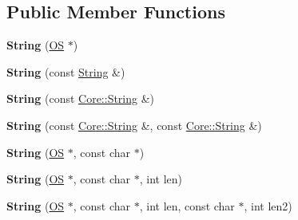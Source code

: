 \subsection*{Public Member Functions}
\begin{DoxyCompactItemize}
\item 
{\bfseries String} (\hyperlink{class_object_script_1_1_o_s}{OS} $\ast$)\hypertarget{class_object_script_1_1_o_s_1_1_string_a6ab43da520a005c301f9f0b8ee22a6f4}{}\label{class_object_script_1_1_o_s_1_1_string_a6ab43da520a005c301f9f0b8ee22a6f4}

\item 
{\bfseries String} (const \hyperlink{class_object_script_1_1_o_s_1_1_string}{String} \&)\hypertarget{class_object_script_1_1_o_s_1_1_string_a4772eea5e15e791ab9bdfa0bc7e36c61}{}\label{class_object_script_1_1_o_s_1_1_string_a4772eea5e15e791ab9bdfa0bc7e36c61}

\item 
{\bfseries String} (const \hyperlink{class_object_script_1_1_o_s_1_1_core_1_1_string}{Core\+::\+String} \&)\hypertarget{class_object_script_1_1_o_s_1_1_string_a7b6ffa9a29fe062f5f540e231c7ae4c0}{}\label{class_object_script_1_1_o_s_1_1_string_a7b6ffa9a29fe062f5f540e231c7ae4c0}

\item 
{\bfseries String} (const \hyperlink{class_object_script_1_1_o_s_1_1_core_1_1_string}{Core\+::\+String} \&, const \hyperlink{class_object_script_1_1_o_s_1_1_core_1_1_string}{Core\+::\+String} \&)\hypertarget{class_object_script_1_1_o_s_1_1_string_af64bfc28aae9fa9c2096f15d0e479511}{}\label{class_object_script_1_1_o_s_1_1_string_af64bfc28aae9fa9c2096f15d0e479511}

\item 
{\bfseries String} (\hyperlink{class_object_script_1_1_o_s}{OS} $\ast$, const char $\ast$)\hypertarget{class_object_script_1_1_o_s_1_1_string_a4e0ddd349d4435f54c7113ddffc3877d}{}\label{class_object_script_1_1_o_s_1_1_string_a4e0ddd349d4435f54c7113ddffc3877d}

\item 
{\bfseries String} (\hyperlink{class_object_script_1_1_o_s}{OS} $\ast$, const char $\ast$, int len)\hypertarget{class_object_script_1_1_o_s_1_1_string_aa3890af938574b566e346f968915b5de}{}\label{class_object_script_1_1_o_s_1_1_string_aa3890af938574b566e346f968915b5de}

\item 
{\bfseries String} (\hyperlink{class_object_script_1_1_o_s}{OS} $\ast$, const char $\ast$, int len, const char $\ast$, int len2)\hypertarget{class_object_script_1_1_o_s_1_1_string_a08b1d00cb36e982ec7b17e0a9b35d261}{}\label{class_object_script_1_1_o_s_1_1_string_a08b1d00cb36e982ec7b17e0a9b35d261}


\end{DoxyCompactItemize}
